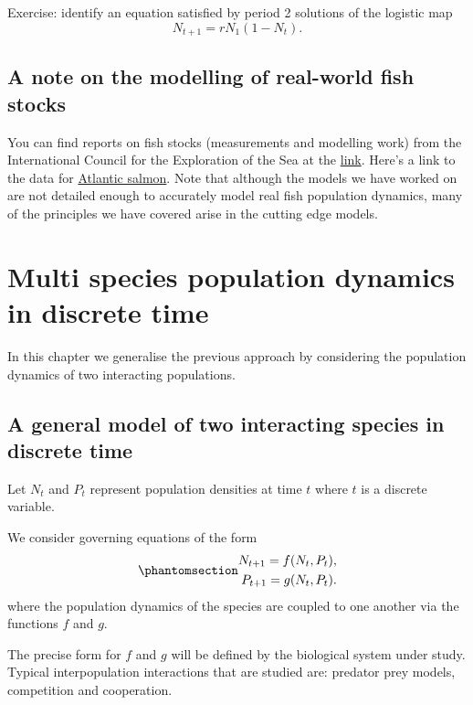 \documentclass[
  letterpaper,
  DIV=11,
  numbers=noendperiod]{scrreprt}
\begin{document}
Exercise: identify an equation satisfied by period 2 solutions of the
logistic map \[ 
 N_{t+1}=rN_1(1-N_t).
\]

\section{A note on the modelling of real-world fish
stocks}\label{a-note-on-the-modelling-of-real-world-fish-stocks}

You can find reports on fish stocks (measurements and modelling work)
from the International Council for the Exploration of the Sea at the
\href{http://www.ices.dk/Pages/default.aspx}{link}. Here's a link to the
data for \href{https://tinyurl.com/ya8sh72j}{Atlantic salmon}. Note that
although the models we have worked on are not detailed enough to
accurately model real fish population dynamics, many of the principles
we have covered arise in the cutting edge models.

\chapter{Multi species population dynamics in discrete
time}\label{multi-species-population-dynamics-in-discrete-time}

In this chapter we generalise the previous approach by considering the
population dynamics of two interacting populations.

\section{A general model of two interacting species in discrete
time}\label{a-general-model-of-two-interacting-species-in-discrete-time}

Let \(N_t\) and \(P_t\) represent population densities at time \(t\)
where \(t\) is a discrete variable.

We consider governing equations of the form
\begin{equation}\protect\phantomsection\label{eq-discretetimetwovar}{
\begin{aligned}
N_{t+1}=f(N_t,P_t), \nonumber \\
P_{t+1}=g(N_t,P_t).
\end{aligned}
}\end{equation} where the population dynamics of the species are coupled
to one another via the functions \(f\) and \(g\).

The precise form for \(f\) and \(g\) will be defined by the biological
system under study. Typical interpopulation interactions that are
studied are: predator prey models, competition and cooperation.
\end{document}
